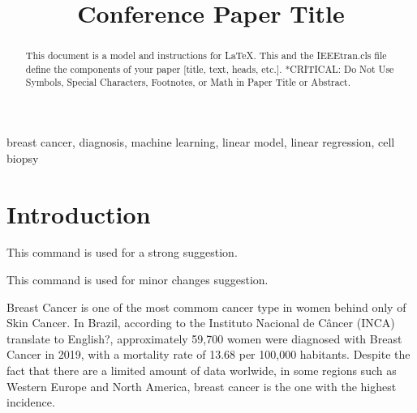 \documentclass[conference]{IEEEtran}
\newcommand{\reviewNormal}[1]{{\color{yellow} #1}} %
\newcommand{\reviewMinor}[1]{{\color{green} #1}} %
\begin{document}
\title{Conference Paper Title}

\author{
\and
{}
}

\maketitle

\begin{abstract}
This document is a model and instructions for \LaTeX.
This and the IEEEtran.cls file define the components of your paper [title, text, heads, etc.]. *CRITICAL: Do Not Use Symbols, Special Characters, Footnotes, 
or Math in Paper Title or Abstract.
\end{abstract}

\begin{IEEEkeywords}
breast cancer, diagnosis, machine learning, linear model, linear regression, cell biopsy
\end{IEEEkeywords}

\section{Introduction}



\reviewNormal{This command is used for a strong suggestion.}

\reviewMinor{This command is used for minor changes suggestion.}

Breast Cancer is one of the most commom cancer type in women behind only of Skin Cancer. In Brazil, according to 
the Instituto Nacional de Câncer (INCA) \reviewMinor{translate to English?}, approximately 59,700 women were diagnosed
with Breast Cancer in 2019, with a mortality rate of 13.68 per 100,000 habitants. 
Despite the fact that there are a limited amount of data worlwide, in some regions such as Western Europe and North America,
breast cancer is the one with the highest incidence.
\end{document}
